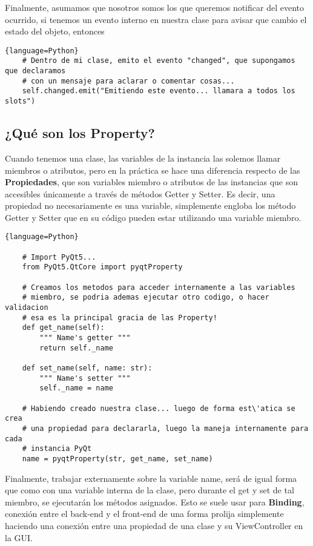 Finalmente, asumamos que nosotros somos los que queremos notificar del evento ocurrido, si tenemos
un evento interno en nuestra clase para avisar que cambio el estado del objeto, entonces
\begin{lstlisting}{language=Python}
    # Dentro de mi clase, emito el evento "changed", que supongamos que declaramos
    # con un mensaje para aclarar o comentar cosas...
    self.changed.emit("Emitiendo este evento... llamara a todos los slots")
\end{lstlisting}

\subsection{¿Qu\'e son los Property?}
\label{qt_properties}
Cuando tenemos una clase, las variables de la instancia las solemos llamar miembros o atributos, pero en la pr\'actica se hace una diferencia
respecto de las \textbf{Propiedades}, que son variables miembro o atributos de las instancias que son accesibles \'unicamente a trav\'es de m\'etodos
Getter y Setter. Es decir, una propiedad no necesariamente es una variable, simplemente engloba los m\'etodo Getter y Setter que en su c\'odigo pueden estar
utilizando una variable miembro.

\begin{lstlisting}{language=Python}

    # Import PyQt5...
    from PyQt5.QtCore import pyqtProperty

    # Creamos los metodos para acceder internamente a las variables
    # miembro, se podria ademas ejecutar otro codigo, o hacer validacion
    # esa es la principal gracia de las Property!
    def get_name(self):
        """ Name's getter """
        return self._name
    
    def set_name(self, name: str):
        """ Name's setter """
        self._name = name

    # Habiendo creado nuestra clase... luego de forma est\'atica se crea
    # una propiedad para declararla, luego la maneja internamente para cada
    # instancia PyQt
    name = pyqtProperty(str, get_name, set_name)

\end{lstlisting}

Finalmente, trabajar externamente sobre la variable name, ser\'a de igual forma que como con una variable
interna de la clase, pero durante el get y set de tal miembro, se ejecutar\'an los m\'etodos asignados. Esto
se suele usar para \textbf{Binding}, conexi\'on entre el back-end y el front-end de una forma prolija simplemente
haciendo una conexi\'on entre una propiedad de una clase y su ViewController en la GUI.

